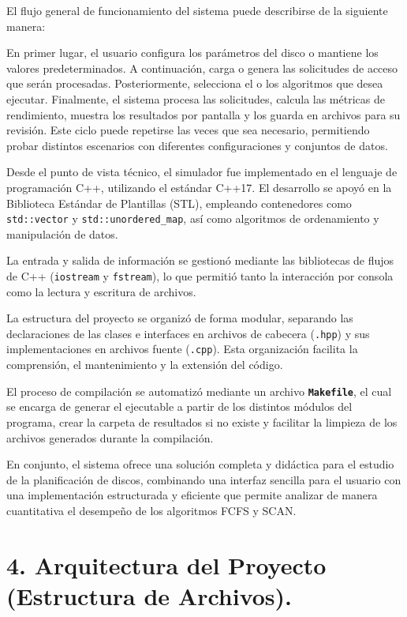 \documentclass[14pt,letterpaper]{extarticle}
\begin{document}
El flujo general de funcionamiento del sistema puede describirse de la siguiente manera:

En primer lugar, el usuario configura los parámetros del disco o mantiene los valores predeterminados. A continuación, carga o genera las solicitudes de acceso que serán procesadas. Posteriormente, selecciona el o los algoritmos que desea ejecutar. Finalmente, el sistema procesa las solicitudes, calcula las métricas de rendimiento, muestra los resultados por pantalla y los guarda en archivos para su revisión. Este ciclo puede repetirse las veces que sea necesario, permitiendo probar distintos escenarios con diferentes configuraciones y conjuntos de datos.

Desde el punto de vista técnico, el simulador fue implementado en el lenguaje de programación C++, utilizando el estándar C++17. El desarrollo se apoyó en la Biblioteca Estándar de Plantillas (STL), empleando contenedores como \texttt{std::vector} y \texttt{std::unordered\_map}, así como algoritmos de ordenamiento y manipulación de datos.

La entrada y salida de información se gestionó mediante las bibliotecas de flujos de C++ (\texttt{iostream} y \texttt{fstream}), lo que permitió tanto la interacción por consola como la lectura y escritura de archivos.

La estructura del proyecto se organizó de forma modular, separando las declaraciones de las clases e interfaces en archivos de cabecera (\texttt{.hpp}) y sus implementaciones en archivos fuente (\texttt{.cpp}). Esta organización facilita la comprensión, el mantenimiento y la extensión del código.

El proceso de compilación se automatizó mediante un archivo \texttt{\textbf{Makefile}}, el cual se encarga de generar el ejecutable a partir de los distintos módulos del programa, crear la carpeta de resultados si no existe y facilitar la limpieza de los archivos generados durante la compilación.

En conjunto, el sistema ofrece una solución completa y didáctica para el estudio de la planificación de discos, combinando una interfaz sencilla para el usuario con una implementación estructurada y eficiente que permite analizar de manera cuantitativa el desempeño de los algoritmos FCFS y SCAN.

\section*{4. Arquitectura del Proyecto (Estructura de Archivos).}
\end{document}
